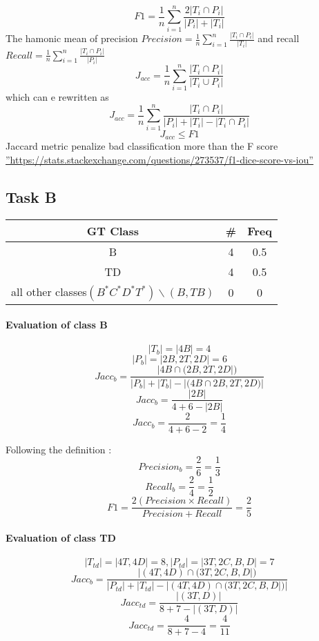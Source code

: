 \documentclass[10pt]{article}
\begin{document}
\paragraph{}
 $$F1 =\frac{1}{n}\sum_{i=1}^{n} \frac{2|{T_i}\cap{P_i}|}{|P_i|+|T_i|}$$
 The hamonic mean of precision $Precision =\frac{1}{n}\sum_{i=1}^{n} \frac{|{T_i}\cap{P_i}|}{|T_i|}$ and recall\\$Recall =\frac{1}{n}\sum_{i=1}^{n} \frac{|{T_i}\cap{P_i}|}{|P_i|}$
 $$J_{acc} =\frac{1}{n}\sum_{i=1}^{n} \frac{|{T_i}\cap{P_i}|}{|{T_i}\cup{P_i}|}$$
 which can e rewritten as
 $$J_{acc} =\frac{1}{n}\sum_{i=1}^{n} \frac{|{T_i}\cap{P_i}|}{|P_i|+|T_i|-|{T_i}\cap{P_i}|}$$
 $$J_{acc}\leq{F1}$$
Jaccard metric penalize bad classification more than the F score \hyperref[besteval]{''https://stats.stackexchange.com/questions/273537/f1-dice-score-vs-iou''}


\subsection{Task B}
\begin{center}
\begin{tabular}{ c c c }
 GT Class & \# & Freq  \\
 \hline
 B & 4 &  0.5  \\ 
 TD & 4 & 0.5   \\ 
 all other classes$(B^*C^*D^*T^*)\backslash (B,TB)$ & 0 & 0 
\end{tabular}
\end{center}
\paragraph{Evaluation of class B}
$$|T_b| = |4B| = 4 $$ 
$$|P_b| = |2B,2T,2D| = 6$$
$$Jacc_b = \frac{|4B\cap{(2B,2T,2D}|)}{|P_b|+|T_b|-|(4B\cap{2B,2T,2D)}|}$$
$$Jacc_b = \frac{|2B|}{4+6-|2B|}$$
$$Jacc_b = \frac{2}{4+6-2} = \frac{1}{4}$$

Following the definition :
$$Precision_b = \frac{2}{6} = \frac{1}{3}$$
$$Recall_b = \frac{2}{4} = \frac{1}{2}$$
$$F1 = \frac{2(Precision\times Recall)}{Precision + Recall} = \frac{2}{5}$$

\paragraph{Evaluation of class TD}  
$$|T_{td}| = |4T,4D| = 8, |P_{td}| = |3T,2C,B,D| = 7$$
$$Jacc_b = \frac{|(4T,4D)\cap{(3T,2C,B,D}|)}{|P_{td}|+|T_{td}|-|(4T,4D)\cap{(3T,2C,B,D}|)|}$$
$$Jacc_{td} = \frac{|(3T,D)|}{8+7-|(3T,D)|}$$
$$Jacc_{td} = \frac{4}{8+7-4} = \frac{4}{11}$$
\end{document}
